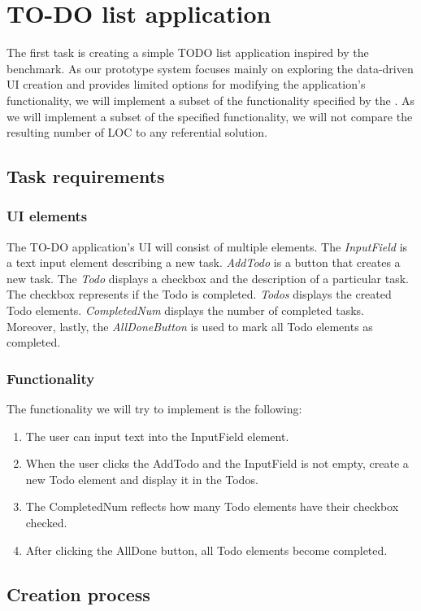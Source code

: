 \section{TO-DO list application}
The first task is creating a simple TODO list application inspired by the \citet{TodoMVC} benchmark.
As our prototype system focuses mainly on exploring the data-driven UI creation and provides limited options for modifying the application's functionality,
we will implement a subset of the functionality specified by the \citet{todo-spec}.
As we will implement a subset of the specified functionality, we will not compare the resulting number of LOC to any referential solution.

\subsection{Task requirements}
\medskip
\subsubsection{UI elements}
The TO-DO application's UI will consist of multiple elements.
The \emph{InputField} is a text input element describing a new task.
\emph{AddTodo} is a button that creates a new task.
The \emph{Todo} displays a checkbox and the description of a particular task. The checkbox represents if the Todo is completed.
\emph{Todos} displays the created Todo elements.
\emph{CompletedNum} displays the number of completed tasks.
Moreover, lastly, the \emph{AllDoneButton} is used to mark all Todo elements as completed.

\subsubsection{Functionality}
The functionality we will try to implement is the following:
\begin{enumerate}
	\item The user can input text into the InputField element.
	\item When the user clicks the AddTodo and the InputField is not empty, create a new Todo element and display it in the Todos.
	\item The CompletedNum reflects how many Todo elements have their checkbox checked.
	\item After clicking the AllDone button, all Todo elements become completed.
\end{enumerate}
\medskip
\subsection{Creation process}

